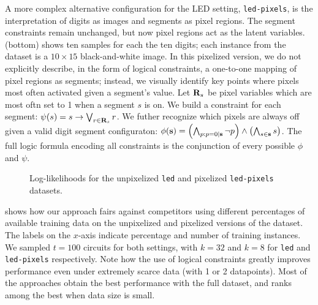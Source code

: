 A more complex alternative configuration for the LED setting, \texttt{led-pixels}, is the
interpretation of digits as images and segments as pixel regions. The segment constraints remain
unchanged, but now pixel regions act as the latent variables.  (bottom) shows ten samples
for each the ten digits; each instance from the dataset is a $10\times 15$ black-and-white image.
In this pixelized version, we do not explicitly describe, in the form of logical constraints, a
one-to-one mapping of pixel regions as segments; instead, we visually identify key points where
pixels most often activated given a segment's value. Let $\mathbf{R}_s$ be pixel variables which are
most oftn set to 1 when a segment $s$ is on. We build a constraint for each segment: $\psi(s)=s\to
\bigvee_{r\in\mathbf{R}_s} r$. We futher recognize which pixels are always off given a valid digit
segment configuraton: $\phi(\mathbf{s})=\left(\bigwedge_{p:p=0|\mathbf{s}} \neg p\right)\wedge\left(
\bigwedge_{s\in\mathbf{s}} s\right)$. The full logic formula encoding all constraints is the
conjunction of every possible $\phi$ and $\psi$.


\begin{figure}[t]
  \begin{subfigure}{0.495\textwidth}
    \caption{}
    \label{fig:ll-led}
  \end{subfigure}
  \begin{subfigure}{0.495\textwidth}
    \caption{}
    \label{fig:ll-led-pixels}
  \end{subfigure}
  \caption{Log-likelihoods for the unpixelized \texttt{led}  and pixelized
    \texttt{led-pixels}  datasets.}
  \label{fig:ll-led-all}
\end{figure}

 shows how our approach fairs against competitors using different percentages
of available training data on the unpixelized and pixelized versions of the dataset. The labels on
the $x$-axis indicate percentage and number of training instances. We sampled $t=100$ circuits for
both settings, with $k=32$ and $k=8$ for \texttt{led} and \texttt{led-pixels} respectively. Note
how the use of logical constraints greatly improves performance even under extremely scarce data
(with 1 or 2 datapoints). Most of the  approaches obtain the best performance
with the full dataset, and ranks among the best when data size is small.

